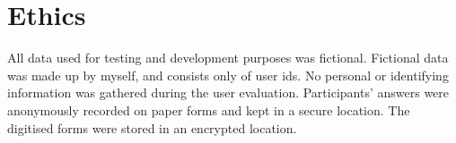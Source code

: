 \chapter{Ethics}
All data used for testing and development purposes was fictional. Fictional data was made up by myself, and consists only of user ids. No personal or identifying information was gathered during the user evaluation. Participants' answers were anonymously recorded on paper forms and kept in a secure location. The digitised forms were stored in an encrypted location.